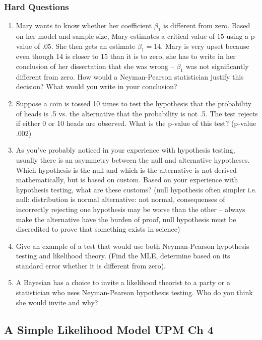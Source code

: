 \documentclass[11pt]{article}
\begin{document}
\subsubsection{Hard Questions}
\begin{enumerate}
\item Mary wants to know whether her coefficient $\beta_1$ is different from zero.  Based on her model and sample size, Mary estimates a critical value of $15$ using a p-value of $.05$.   She then gets an estimate $\beta_1=14$.  Mary is very upset because even though 14 is closer to 15 than it is to zero, she has to write in her conclusion of her dissertation that she was wrong -- $\beta_1$ was not significantly different from zero.  How would a Neyman-Pearson statistician justify this decision?  What would you write in your conclusion? 
\item Suppose a coin is tossed 10 times to test the hypothesis that the probability of heads is .5 vs. the alternative that the probability is not .5.  The test rejects if either 0 or 10 heads are observed.  What is the p-value of this test?  (p-value .002)  
\item As you've probably noticed in your experience with hypothesis testing, usually there is an asymmetry between the null and alternative hypotheses.  Which hypothesis is the null and which is the alternative is not derived mathematically, but is based on custom.  Based on your experience with hypothesis testing, what are these customs?  (null hypothesis often simpler i.e. null: distribution is normal alternative: not normal, consequenses of incorrectly rejecting one hypothesis may be worse than the other -- always make the alternative have the burden of proof, null hypothesis must be discredited to prove that something exists in science)  
\item Give an example of a test that would use both Neyman-Pearson hypothesis testing and likelihood theory. (Find the MLE, determine based on its standard error whether it is different from zero). 
\item A Bayesian has a choice to invite a likelihood theorist to a party or a statistician who uses Neyman-Pearson hypothesis testing.  Who do you think she would invite and why? 
\end{enumerate}

\subsection{A Simple Likelihood Model UPM Ch 4}
\end{document}
